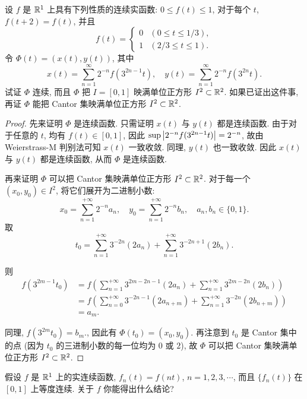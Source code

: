 \documentclass{article}
\begin{document}
\begin{problem}[7-14]
设 $f$ 是 $\mathbb{R}^1$ 上具有下列性质的连续实函数: $0 \le f(t) \le 1$, 对于每个 $t$, $f(t + 2) = f(t)$, 并且
\[
f(t) =
\begin{cases}
0 & (0 \le t \le 1 / 3),\\
1 & (2 / 3 \le t \le 1).
\end{cases}
\]
令 $\Phi(t) = (x(t), y(t))$, 其中
\[
x(t) = \sum_{n=1}^\infty 2^{-n} f(3^{2n - 1} t), \quad y(t) = \sum_{n=1}^\infty 2^{-n} f(3^{2n} t).
\]
试证 $\Phi$ 连续, 而且 $\Phi$ 把 $I = [0, 1]$ 映满单位正方形 $I^2 \subset \mathbb{R}^2$. 如果已证出这件事, 再证 $\Phi$ 能把 Cantor 集映满单位正方形 $I^2 \subset \mathbb{R}^2$.
\end{problem}

\begin{proof}
  先来证明 \( \Phi \) 是连续函数. 只需证明 \( x(t) \) 与 \( y(t) \) 都是连续函数. 由于对于任意的 \( t \), 均有 \( f(t)\in [0,1] \), 因此 \( \sup\left|2^{-n}f(3^{2n-1}t)\right| = 2^{-n} \), 故由 Weierstrass-M 判别法可知 \( x(t) \) 一致收敛. 同理, \( y(t) \) 也一致收敛. 因此 \( x(t) \) 与 \( y(t) \) 都是连续函数, 从而 \( \Phi \) 是连续函数.

  再来证明 \( \Phi \) 可以把 Cantor 集映满单位正方形 $I^2 \subset \mathbb{R}^2$. 对于每一个 \( (x_0,y_0) \in I^2 \), 将它们展开为二进制小数:
  \[ x_0=\sum_{n=1}^{+\infty}2^{-n}a_n, \quad 
  y_0 = \sum_{n=1}^{+\infty}2^{-n}b_n, \quad a_n,b_n\in\{0,1\}. \]
  取
  \[ t_0=\sum_{n=1}^{+\infty}3^{-2n}(2a_n) 
  + \sum_{n=1}^{+\infty}3^{-2n+1}(2b_n). \]

  则
  \begin{align*}
    f(3^{2m-1}t_0) &= f\left( \sum_{n=1}^{+\infty}3^{2m-2n-1}(2a_n) 
  + \sum_{n=1}^{+\infty}3^{2m-2n}(2b_n) \right)\\
  &= f\left( \sum_{n=0}^{+\infty}3^{-2n-1}(2a_{n+m}) 
  + \sum_{n=1}^{+\infty}3^{-2n}(2b_{n+m}) \right)\\
  &=a_m.
  \end{align*}

  同理, \( f(3^{2m}t_0)=b_m. \), 因此有 \( \Phi(t_0)=(x_0,y_0) \). 再注意到 \( t_0 \) 是 Cantor 集中的点 (因为 \( t_0 \) 的三进制小数的每一位均为 \( 0 \) 或 \( 2 \)), 故 \( \Phi \) 可以把 Cantor 集映满单位正方形 $I^2 \subset \mathbb{R}^2$.
\end{proof}



\begin{problem}[7-15]
假设 $f$ 是 $\mathbb{R}^1$ 上的实连续函数, $f_n(t) = f(nt)$, $n=1, 2, 3, \cdots$, 而且 $\{f_n(t)\}$ 在 $[0, 1]$ 上等度连续. 关于 $f$ 你能得出什么结论?
\end{problem}
\end{document}
